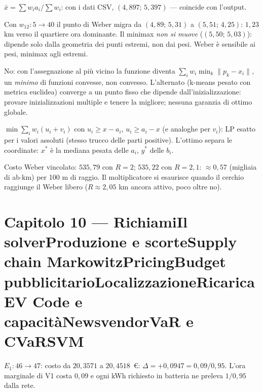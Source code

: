 \documentclass[11pt,a4paper]{article}
\newcounter{cap}
\newcounter{sol}[cap]
\newcommand{\capitolo}[1]{\setcounter{cap}{#1}\section*{Capitolo #1 --- \capnome{#1}}}
\newcommand{\capnome}[1]{%
  \ifcase#1\or\or Richiami\or Il solver\or Produzione e scorte\or Supply chain\or
  Markowitz\or Pricing\or Budget pubblicitario\or Localizzazione\or Ricarica EV\or
  Code e capacità\or Newsvendor\or VaR e CVaR\or SVM\fi}
\begin{document}
\begin{soluzione}[verifica]
$\bar x = \sum w_i a_i / \sum w_i$: con i dati CSV,
$(4{,}897;\, 5{,}397)$ --- coincide con l'output.
\end{soluzione}

\begin{soluzione}
Con $w_{12}: 5 \to 40$ il punto di Weber migra da $(4{,}89;\, 5{,}31)$ a
$(5{,}51;\, 4{,}25)$: $1{,}23$ km verso il quartiere ora dominante. Il minimax
\emph{non si muove} ($(5{,}50;\, 5{,}03)$): dipende solo dalla geometria dei punti
estremi, non dai pesi. Weber è sensibile ai pesi, minimax agli estremi.
\end{soluzione}

\begin{soluzione}
No: con l'assegnazione al più vicino la funzione diventa
$\sum_i w_i \min_k \|p_k - x_i\|$, un \emph{minimo} di funzioni convesse, non
convesso. L'alternato (k-means pesato con metrica euclidea) converge a un punto
fisso che dipende dall'inizializzazione: provare inizializzazioni multiple e tenere
la migliore; nessuna garanzia di ottimo globale.
\end{soluzione}

\begin{soluzione}[Manhattan]
$\min \sum_i w_i (u_i + v_i)$ con $u_i \ge x - a_i$, $u_i \ge a_i - x$ (e analoghe
per $v_i$): LP esatto per i valori assoluti (stesso trucco delle parti positive).
L'ottimo separa le coordinate: $x^*$ è la mediana pesata delle $a_i$, $y^*$ delle
$b_i$.
\end{soluzione}

\begin{soluzione}
Costo Weber vincolato: $535{,}79$ con $R = 2$; $535{,}22$ con $R = 2{,}1$:
$\approx 0{,}57$ (migliaia di ab$\cdot$km) per 100 m di raggio. Il moltiplicatore si
esaurisce quando il cerchio raggiunge il Weber libero ($R \approx 2{,}05$ km ancora
attivo, poco oltre no).
\end{soluzione}

\capitolo{10}

\begin{soluzione}[verifica]
$E_1: 46 \to 47$: costo da $20{,}3571$ a $20{,}4518$~\euro:
$\Delta = +0{,}0947 = 0{,}09/0{,}95$. L'ora marginale di V1 costa $0{,}09$ e ogni
kWh richiesto in batteria ne preleva $1/0{,}95$ dalla rete.
\end{soluzione}
\end{document}
